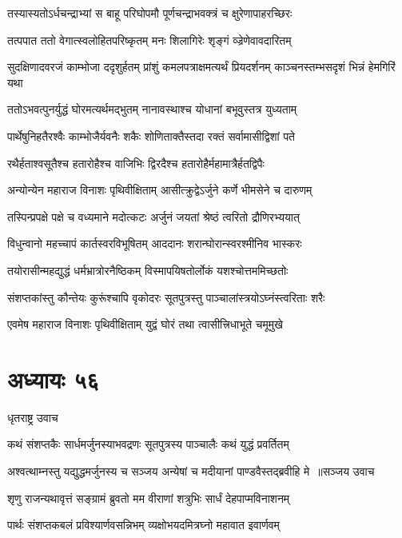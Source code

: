 \twolineshloka
{तस्यास्यतोऽर्धचन्द्राभ्यां स बाहू परिघोपमौ}
{पूर्णचन्द्राभवक्त्रं च क्षुरेणापाहरच्छिरः}


\twolineshloka
{तत्पपात ततो वेगात्स्वलोहितपरिष्कृतम्}
{मनः शिलागिरेः शृङ्गं व्ज्रेणेवावदारितम्}


\threelineshloka
{सुदक्षिणादवरजं काम्भोजा ददृशुर्हतम्}
{प्रांशुं कमलपत्राक्षमत्यर्थं प्रियदर्शनम्}
{काञ्चनस्तम्भसदृशं भिन्नं हेमगिरिं यथा}


\twolineshloka
{ततोऽभवत्पुनर्युद्धं घोरमत्यर्थमद्भुतम्}
{नानावस्थाश्च योधानां बभूवुस्तत्र युध्यताम्}


\twolineshloka
{पार्थेषुनिहतैरश्वैः काम्भोजैर्यवनैः शकैः}
{शोणिताक्तैस्तदा रक्तं सर्वामासीद्विशां पते}


\twolineshloka
{रथैर्हताश्वसूतैश्च हतारोहैश्च वाजिभिः}
{द्विरदैश्च हतारोहैर्महामात्रैर्हतद्विपैः}


\twolineshloka
{अन्योन्येन महाराज विनाशः पृथिवीक्षिताम्}
{आसीत्क्रुद्वेऽर्जुने कर्णे भीमसेने च दारुणम्}


\twolineshloka
{तस्पिन्प्रपक्षे पक्षे च वध्यमाने मदोत्कटः}
{अर्जुनं जयतां श्रेष्ठं त्वरितो द्रौणिरभ्ययात्}


\twolineshloka
{विधुन्वानो महच्चापं कार्तस्वरविभूषितम्}
{आददानः शरान्घोरान्स्वरश्मीनिव भास्करः}


\twolineshloka
{तयोरासीन्महद्युद्धं धर्मभ्रात्रोरनैष्ठिकम्}
{विस्मापयिषतोर्लोकं यशश्चोत्तममिच्छतोः}


\twolineshloka
{संशप्तकांस्तु कौन्तेयः कुरूंश्चापि वृकोदरः}
{सूतपुत्रस्तु पाञ्चालांस्त्रयोऽघ्नंस्त्वरिताः शरैः}


\twolineshloka
{एवमेष महाराज विनाशः पृथिवीक्षिताम्}
{युद्वं घोरं तथा त्वासीत्त्रिधाभूते चमूमुखे}


\chapter{अध्यायः ५६}
\twolineshloka
{धृतराष्ट्र उवाच}
{}


\twolineshloka
{कथं संशप्तकैः सार्धमर्जुनस्याभवद्रणः}
{सूतपुत्रस्य पाञ्चालैः कथं युद्धं प्रवर्तितम्}


\threelineshloka
{अश्वत्थाम्नस्तु यद्युद्धमर्जुनस्य च सञ्जय}
{अन्येषां च मदीयानां पाण्डवैस्तद्ब्रवीहि मे ॥सञ्जय उवाच}
{}


\twolineshloka
{शृणु राजन्यथावृत्तं सङ्ग्रामं ब्रुवतो मम}
{वीराणां शत्रुभिः सार्धं देहपाप्मविनाशनम्}


\twolineshloka
{पार्थः संशप्तकबलं प्रविश्यार्णवसन्निभम्}
{व्यक्षोभयदमित्रघ्नो महावात इवार्णवम्}


